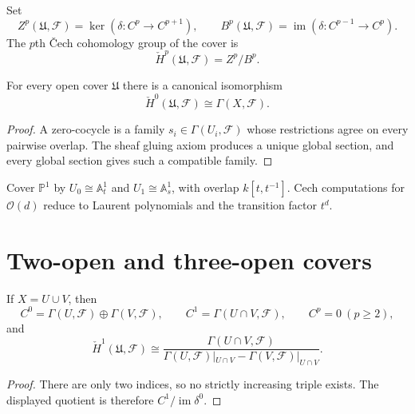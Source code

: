 \begin{definition}\label{def:vi47-cohomology}
Set
\[
Z^p(\mathfrak U,\mathcal F)=\ker(\delta:C^p\to C^{p+1}),
\qquad
B^p(\mathfrak U,\mathcal F)=\operatorname{im}(\delta:C^{p-1}\to C^p).
\]
The $p$th \v{C}ech cohomology group of the cover is
\[
\check H^p(\mathfrak U,\mathcal F)=Z^p/B^p.
\]
\end{definition}

\begin{proposition}\label{prop:vi47-h0}
For every open cover $\mathfrak U$ there is a canonical isomorphism
\[
\check H^0(\mathfrak U,\mathcal F)\cong\Gamma(X,\mathcal F).
\]
\begin{proof}
A zero-cocycle is a family $s_i\in\Gamma(U_i,\mathcal F)$ whose restrictions agree on every pairwise overlap.  The sheaf gluing axiom produces a unique global section, and every global section gives such a compatible family.
\end{proof}
\end{proposition}

\begin{example}\label{ex:vi47-expand-02}
Cover $\mathbb P^1$ by $U_0\cong\mathbb A^1_t$ and $U_1\cong\mathbb A^1_s$, with overlap $k[t,t^{-1}]$.  Cech computations for $\mathcal O(d)$ reduce to Laurent polynomials and the transition factor $t^d$.
\end{example}
\section{Two-open and three-open covers}

\begin{proposition}\label{prop:vi47-two-open}
If $X=U\cup V$, then
\[
C^0=\Gamma(U,\mathcal F)\oplus\Gamma(V,\mathcal F),
\qquad
C^1=\Gamma(U\cap V,\mathcal F),
\qquad
C^p=0\ (p\ge2),
\]
and
\[
\check H^1(\mathfrak U,\mathcal F)
\cong
\frac{\Gamma(U\cap V,\mathcal F)}
{\Gamma(U,\mathcal F)|_{U\cap V}-\Gamma(V,\mathcal F)|_{U\cap V}}.
\]
\begin{proof}
There are only two indices, so no strictly increasing triple exists.  The displayed quotient is therefore $C^1/\operatorname{im}\delta^0$.
\end{proof}
\end{proposition}

